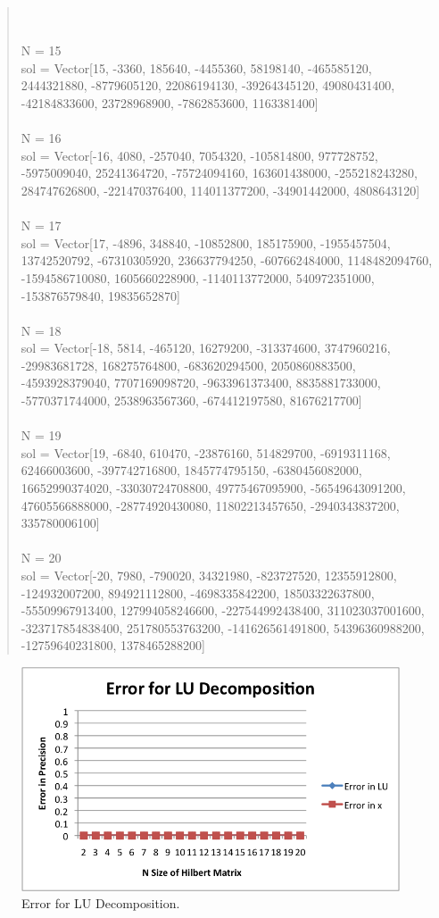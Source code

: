 \documentclass[letterpaper,12pt]{article}
\begin{document}
\begin{quote}
\\
\\N = 15
\\sol = Vector[15, -3360, 185640, -4455360, 58198140, -465585120, 2444321880, -8779605120, 22086194130, -39264345120, 49080431400, -42184833600, 23728968900, -7862853600, 1163381400]
\\
\\N = 16
\\sol = Vector[-16, 4080, -257040, 7054320, -105814800, 977728752, -5975009040, 25241364720, -75724094160, 163601438000, -255218243280, 284747626800, -221470376400, 114011377200, -34901442000, 4808643120]
\\
\\N = 17
\\sol = Vector[17, -4896, 348840, -10852800, 185175900, -1955457504, 13742520792, -67310305920, 236637794250, -607662484000, 1148482094760, -1594586710080, 1605660228900, -1140113772000, 540972351000, -153876579840, 19835652870]
\\
\\N = 18
\\sol = Vector[-18, 5814, -465120, 16279200, -313374600, 3747960216, -29983681728, 168275764800, -683620294500, 2050860883500, -4593928379040, 7707169098720, -9633961373400, 8835881733000, -5770371744000, 2538963567360, -674412197580, 81676217700]
\\
\\N = 19
\\sol = Vector[19, -6840, 610470, -23876160, 514829700, -6919311168, 62466003600, -397742716800, 1845774795150, -6380456082000, 16652990374020, -33030724708800, 49775467095900, -56549643091200, 47605566888000, -28774920430080, 11802213457650, -2940343837200, 335780006100]
\\
\\N = 20
\\sol = Vector[-20, 7980, -790020, 34321980, -823727520, 12355912800, -124932007200, 894921112800, -4698335842200, 18503322637800, -55509967913400, 127994058246600, -227544992438400, 311023037001600, -323717854838400, 251780553763200, -141626561491800, 54396360988200, -12759640231800, 1378465288200]
\end{quote}

\begin{figure}[H]
  \centering
  \includegraphics{LU.png}
  \caption{\label{LU}Error for LU Decomposition.}
\end{figure}
\end{document}
